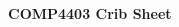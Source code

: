 \documentclass[a4paper]{article}
\begin{document}
\raggedright
\fontsize{10pt}{6pt}\selectfont
\begin{multicols}{4}


\setlength{\premulticols}{1pt}
\setlength{\postmulticols}{1pt}
\setlength{\multicolsep}{1pt}
\setlength{\columnsep}{2pt}
\setlength{\tabcolsep}{2pt}

\setlength{\topsep}{1pt}\setlength{\partopsep}{2pt}

\begin{center}
     \Large{\textbf{COMP4403 Crib Sheet}} \\
\end{center}





\scriptsize

\end{multicols}
\end{document}
